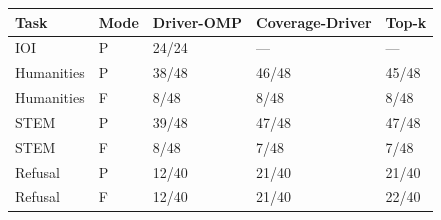\begin{tabular}{lllll}
\toprule
Task & Mode & Driver-OMP & Coverage-Driver & Top-k \\
\midrule
IOI & P & 24/24 & --- & --- \\
Humanities & P & 38/48 & 46/48 & 45/48 \\
Humanities & F & 8/48 & 8/48 & 8/48 \\
STEM & P & 39/48 & 47/48 & 47/48 \\
STEM & F & 8/48 & 7/48 & 7/48 \\
Refusal & P & 12/40 & 21/40 & 21/40 \\
Refusal & F & 12/40 & 21/40 & 22/40 \\
\bottomrule
\end{tabular}
